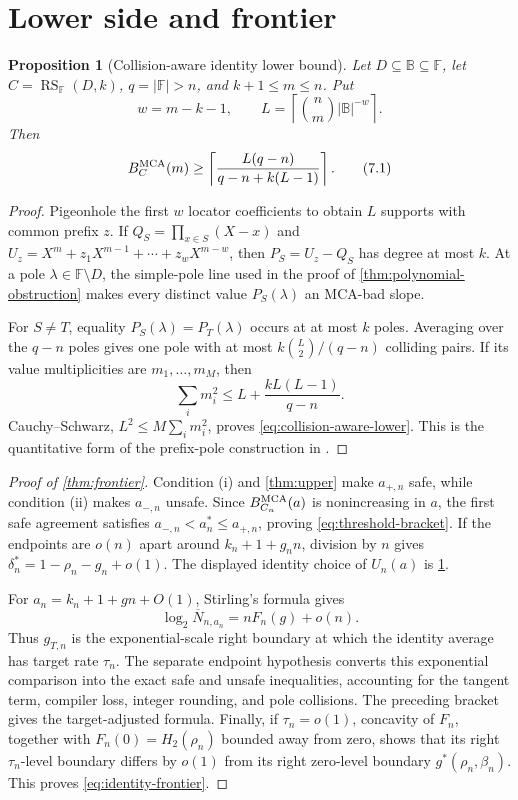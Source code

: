 \documentclass[11pt,a4paper]{amsart}
\numberwithin{equation}{section}
\newtheorem{proposition}[theorem]{Proposition}
\theoremstyle{remark}
\DeclareMathOperator{\RS}{RS}
\newcommand{\F}{\mathbb F}
\newcommand{\B}{\mathbb B}
\newcommand{\barN}{\overline N}
\begin{document}
\section{Lower side and frontier}

\begin{proposition}[Collision-aware identity lower bound]
\label{prop:collision-aware-lower}
Let \(D\subseteq\B\subseteq\F\), let \(C=\RS_\F(D,k)\),
\(q=|\F|>n\), and \(k+1\le m\le n\).  Put
\[
 w=m-k-1,
 \qquad L=\left\lceil\binom nm|\B|^{-w}\right\rceil.
\]
Then
\[
 B_C^{\rm MCA}(m)\ge
 \left\lceil\frac{L(q-n)}{q-n+k(L-1)}\right\rceil.
 \tag{7.1}\label{eq:collision-aware-lower}
\]
\end{proposition}

\begin{proof}
Pigeonhole the first \(w\) locator coefficients to obtain \(L\) supports
with common prefix \(z\).  If
\(Q_S=\prod_{x\in S}(X-x)\) and
\(U_z=X^m+z_1X^{m-1}+\cdots+z_wX^{m-w}\), then
\(P_S=U_z-Q_S\) has degree at most \(k\).  At a pole
\(\lambda\in\F\setminus D\), the simple-pole line used in the proof of
\cref{thm:polynomial-obstruction} makes every distinct value
\(P_S(\lambda)\) an MCA-bad slope.

For \(S\ne T\), equality \(P_S(\lambda)=P_T(\lambda)\) occurs at at most
\(k\) poles.  Averaging over the \(q-n\) poles gives one pole with at most
\(k\binom L2/(q-n)\) colliding pairs.  If its value multiplicities are
\(m_1,\ldots,m_M\), then
\[
 \sum_i m_i^2\le L+\frac{kL(L-1)}{q-n}.
\]
Cauchy--Schwarz, \(L^2\le M\sum_i m_i^2\), proves
\eqref{eq:collision-aware-lower}.  This is the quantitative form of the
prefix-pole construction in \cite{Cho26CapV13,Cho26Grande}.
\end{proof}

\begin{proof}[Proof of \cref{thm:frontier}]
Condition \textup{(i)} and \cref{thm:upper} make \(a_{+,n}\) safe,
while condition \textup{(ii)} makes \(a_{-,n}\) unsafe.  Since
\(B_{C_n}^{\rm MCA}(a)\) is nonincreasing in \(a\), the first safe
agreement satisfies \(a_{-,n}<a_n^*\le a_{+,n}\), proving
\eqref{eq:threshold-bracket}.  If the endpoints are \(o(n)\) apart around
\(k_n+1+g_nn\), division by \(n\) gives
\(\delta_n^*=1-\rho_n-g_n+o(1)\).  The displayed identity choice of
\(U_n(a)\) is \cref{prop:collision-aware-lower}.

For \(a_n=k_n+1+gn+O(1)\), Stirling's formula gives
\[
        \log_2\barN_{n,a_n}
        =nF_n(g)+o(n).
\]
Thus \(g_{T,n}\) is the exponential-scale right boundary at which the
identity average has target rate \(\tau_n\).  The separate endpoint
hypothesis converts this exponential comparison into the exact safe and
unsafe inequalities, accounting for the tangent term, compiler loss,
integer rounding, and pole collisions.  The preceding bracket gives the
target-adjusted formula.  Finally, if \(\tau_n=o(1)\), concavity of
\(F_n\), together with \(F_n(0)=H_2(\rho_n)\) bounded away from zero,
shows that its right \(\tau_n\)-level boundary differs by \(o(1)\) from
its right zero-level boundary \(g^*(\rho_n,\beta_n)\).  This proves
\eqref{eq:identity-frontier}.
\end{proof}
\end{document}
